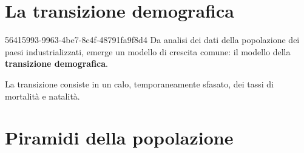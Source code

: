 \documentclass[preview]{standalone}
\begin{document}
\genpage

\section{La transizione demografica}

\begin{snippet}{56415993-9963-4be7-8c4f-48791fa9f8d4}
    Da analisi dei dati della popolazione dei paesi industrializzati,
    emerge un modello di crescita comune:
    il modello della \textbf{transizione demografica}.
    
    La transizione consiste in un calo, temporaneamente sfasato,
    dei tassi di mortalità e natalità.
\end{snippet}


\section{Piramidi della popolazione}
\end{document}
